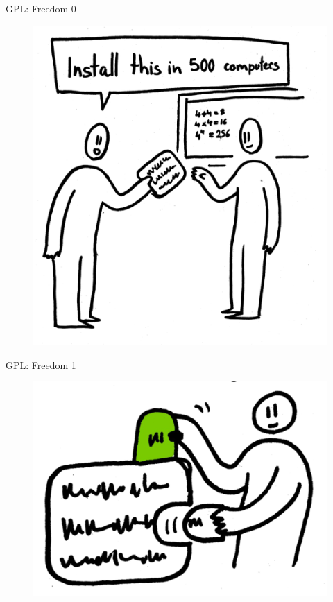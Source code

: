 \documentclass[notes,usenames,dvipsnames]{beamer}       %
\begin{document}
\begin{frame}{GPL: Freedom 0}
  \begin{figure}
    \centering
    \includegraphics[scale=0.3]{img/fr-run.png}
  \end{figure}
\end{frame}

\begin{frame}{GPL: Freedom 1}
  \begin{figure}
    \centering
    \includegraphics[scale=0.3]{img/fr-change.png}
  \end{figure}
\end{frame}
\end{document}
